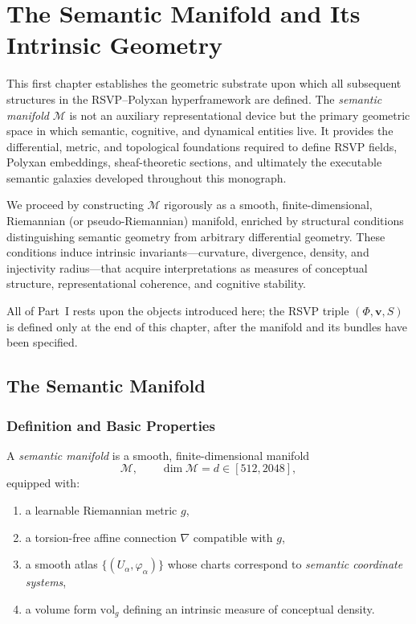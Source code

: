 \chapter{The Semantic Manifold and Its Intrinsic Geometry}
\label{ch:semantic-manifold}

This first chapter establishes the geometric substrate upon which all subsequent structures in the RSVP--Polyxan hyperframework are defined.  
The \emph{semantic manifold} $\mathcal{M}$ is not an auxiliary representational device but the primary geometric space in which semantic, cognitive, and dynamical entities live.  
It provides the differential, metric, and topological foundations required to define RSVP fields, Polyxan embeddings, sheaf-theoretic sections, and ultimately the executable semantic galaxies developed throughout this monograph.

We proceed by constructing $\mathcal{M}$ rigorously as a smooth, finite-dimensional, Riemannian (or pseudo-Riemannian) manifold, enriched by structural conditions distinguishing semantic geometry from arbitrary differential geometry.  
These conditions induce intrinsic invariants---curvature, divergence, density, and injectivity radius---that acquire interpretations as measures of conceptual structure, representational coherence, and cognitive stability.

All of Part~I rests upon the objects introduced here; the RSVP triple $(\Phi, \mathbf{v}, S)$ is defined only at the end of this chapter, after the manifold and its bundles have been specified.

\section{The Semantic Manifold}

\subsection{Definition and Basic Properties}

\begin{definition}
A \emph{semantic manifold} is a smooth, finite-dimensional manifold
\[
\mathcal{M},\qquad \dim \mathcal{M} = d \in [512, 2048],
\]
equipped with:
\begin{enumerate}
\item a learnable Riemannian metric $g$,
\item a torsion-free affine connection $\nabla$ compatible with $g$,
\item a smooth atlas $\{(U_\alpha, \varphi_\alpha)\}$ whose charts correspond to \emph{semantic coordinate systems},
\item a volume form $\mathrm{vol}_g$ defining an intrinsic measure of conceptual density.
\end{enumerate}
\end{definition}

